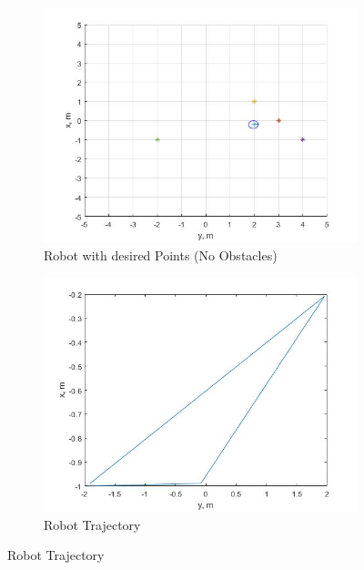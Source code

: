 \documentclass{l4proj}
\begin{document}
\begin{figure}[htb]
    \centering
    \begin{subfigure}{0.45\textwidth}
        \includegraphics[width=\textwidth]{images/Plot task 1 1.jpg}
        \caption{Robot with desired Points (No Obstacles) }
        \label{fig:syn1}
    \end{subfigure}
    \begin{subfigure}{0.45\textwidth}
        \includegraphics[width=\textwidth]{images/Plot task 1 2.jpg}
        \caption{Robot Trajectory}
        \label{fig:syn2}
    \end{subfigure} 
\end{figure}
\end{document}
